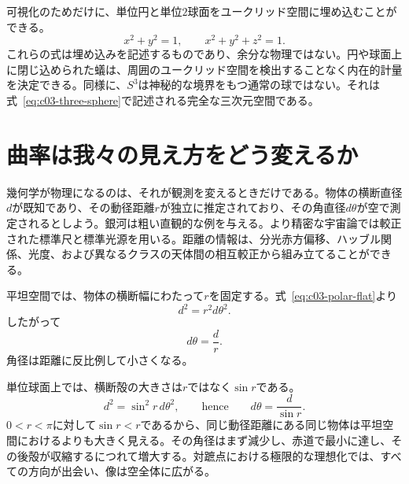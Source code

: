 \begin{classroomqa}
\end{classroomqa}

可視化のためだけに、単位円と単位\(2\)球面をユークリッド空間に埋め込むことができる。
\begin{equation}
x^2+y^2=1,
\qquad
x^2+y^2+z^2=1.
\end{equation}
これらの式は埋め込みを記述するものであり、余分な物理ではない。円や球面上に閉じ込められた蟻は、周囲のユークリッド空間を検出することなく内在的計量を決定できる。同様に、\(S^3\)は神秘的な境界をもつ通常の球ではない。それは式~\eqref{eq:c03-three-sphere}で記述される完全な三次元空間である。

\section{曲率は我々の見え方をどう変えるか}

幾何学が物理になるのは、それが観測を変えるときだけである。物体の横断直径\(d\)が既知であり、その動径距離\(r\)が独立に推定されており、その角直径\(d\theta\)が空で測定されるとしよう。銀河は粗い直観的な例を与える。より精密な宇宙論では較正された標準尺と標準光源を用いる。距離の情報は、分光赤方偏移、ハッブル関係、光度、および異なるクラスの天体間の相互較正から組み立てることができる。

平坦空間では、物体の横断幅にわたって\(r\)を固定する。式~\eqref{eq:c03-polar-flat}より
\begin{equation}
d^2 = r^2 d\theta^2.
\label{eq:c03-flat-angle-step}
\end{equation}
したがって
\begin{equation}
d\theta = \frac{d}{r}.
\label{eq:c03-flat-angle}
\end{equation}
角径は距離に反比例して小さくなる。

単位球面上では、横断殻の大きさは\(r\)ではなく\(\sin r\)である。
\begin{equation}
d^2 = \sin^2 r\, d\theta^2,
\qquad\text{hence}\qquad
d\theta = \frac{d}{\sin r}.
\label{eq:c03-spherical-angle}
\end{equation}
\(0<r<\pi\)に対して\(\sin r<r\)であるから、同じ動径距離にある同じ物体は平坦空間におけるよりも大きく見える。その角径はまず減少し、赤道で最小に達し、その後殻が収縮するにつれて増大する。対蹠点における極限的な理想化では、すべての方向が出会い、像は空全体に広がる。

